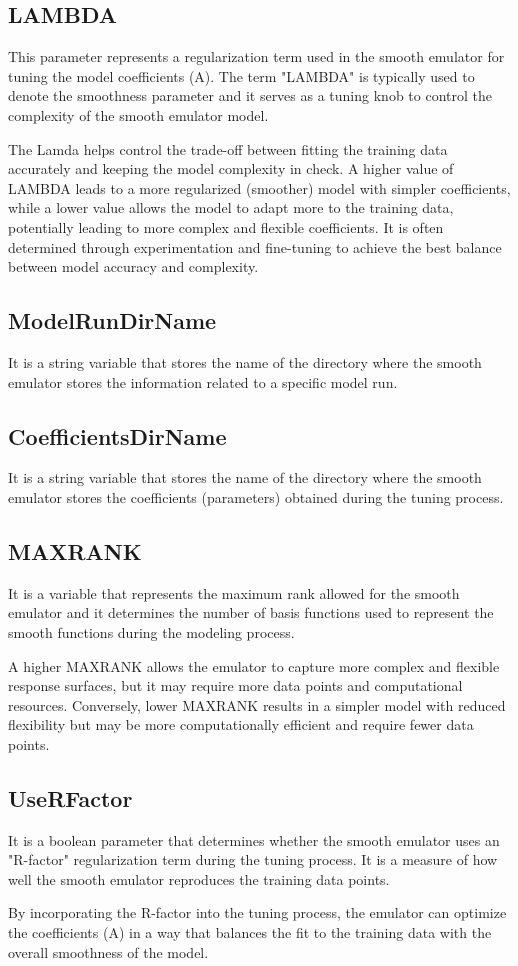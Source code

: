 \documentclass[12pt]{article}
\numberwithin{equation}{section}
\numberwithin{figure}{section}
\begin{document}
\subsection{LAMBDA}

This parameter represents a regularization term used in the smooth emulator for tuning the model coefficients (A). The term "LAMBDA" is typically used to denote the smoothness parameter and it serves as a tuning knob to control the complexity of the smooth emulator model.

The Lamda helps control the trade-off between fitting the training data accurately and keeping the model complexity in check. A higher value of LAMBDA leads to a more regularized (smoother) model with simpler coefficients, while a lower value allows the model to adapt more to the training data, potentially leading to more complex and flexible coefficients. It is often determined through experimentation and fine-tuning to achieve the best balance between model accuracy and complexity.

\subsection{ModelRunDirName}
It is a string variable that stores the name of the directory where the smooth emulator stores the information related to a specific model run.    \\

\subsection{CoefficientsDirName} 
It is a string variable that stores the name of the directory where the smooth emulator stores the coefficients (parameters) obtained during the tuning process. \\

\subsection{MAXRANK}

It is a variable that represents the maximum rank allowed for the smooth emulator and it determines the number of basis functions used to represent the smooth functions during the modeling process. 

A higher MAXRANK allows the emulator to capture more complex and flexible response surfaces, but it may require more data points and computational resources. Conversely, lower MAXRANK results in a simpler model with reduced flexibility but may be more computationally efficient and require fewer data points.


\subsection{UseRFactor}
It is a boolean parameter that determines whether the smooth emulator uses an "R-factor" regularization term during the tuning process. It is a measure of how well the smooth emulator reproduces the training data points.

By incorporating the R-factor into the tuning process, the emulator can optimize the coefficients (A) in a way that balances the fit to the training data with the overall smoothness of the model.
\end{document}
